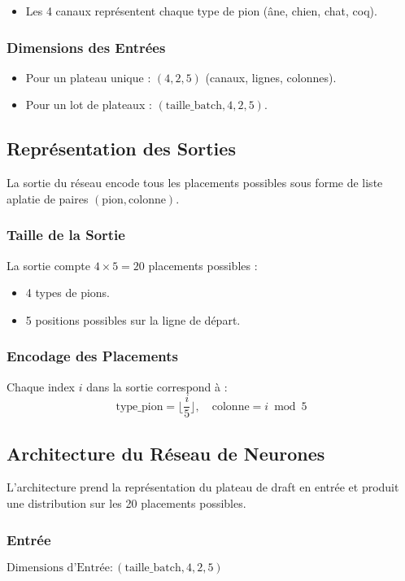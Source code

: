 \documentclass[]{article}
\begin{document}
\begin{itemize}
    \item Les 4 canaux représentent chaque type de pion (âne, chien, chat, coq).
\end{itemize}

\subsubsection{Dimensions des Entrées}
\begin{itemize}
    \item Pour un plateau unique : \((4, 2, 5)\) (canaux, lignes, colonnes).
    \item Pour un lot de plateaux : \((\text{taille\_batch}, 4, 2, 5)\).
\end{itemize}

\subsection{Représentation des Sorties}
La sortie du réseau encode tous les placements possibles sous forme de liste aplatie de paires \((\text{pion}, \text{colonne})\).

\subsubsection{Taille de la Sortie}
La sortie compte \(4 \times 5 = 20\) placements possibles :
\begin{itemize}
    \item 4 types de pions.
    \item 5 positions possibles sur la ligne de départ.
\end{itemize}

\subsubsection{Encodage des Placements}
Chaque index \(i\) dans la sortie correspond à :
\[
\text{type\_pion} = \lfloor \frac{i}{5} \rfloor, \quad
\text{colonne} = i \bmod 5
\]

\subsection{Architecture du Réseau de Neurones}
L'architecture prend la représentation du plateau de draft en entrée et produit une distribution sur les 20 placements possibles.

\subsubsection{Entrée}
\(\text{Dimensions d'Entrée}: (\text{taille\_batch}, 4, 2, 5)\)
\end{document}
